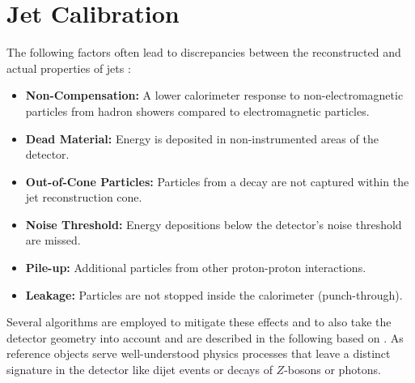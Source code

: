 
\section{Jet Calibration}\label{sec:calibration}
The following factors often lead to discrepancies between the reconstructed and actual properties of jets \citep{atlas2011jet}:
\begin{itemize}
  \item \textbf{Non-Compensation:} A lower calorimeter response to non-electromagnetic particles from hadron showers compared to electromagnetic particles.
  \item \textbf{Dead Material:} Energy is deposited in non-instrumented areas of the detector.
  \item \textbf{Out-of-Cone Particles:} Particles from a decay are not captured within the jet reconstruction cone.
  \item \textbf{Noise Threshold:} Energy depositions below the detector's noise threshold are missed.
  \item \textbf{Pile-up:} Additional particles from other proton-proton interactions.
  \item \textbf{Leakage:} Particles are not stopped inside the calorimeter (punch-through).
\end{itemize}
Several algorithms are employed to mitigate these effects and to also take the detector geometry into account and are described in the following based on \citep{atlas2021jet}. As reference objects serve well-understood physics processes that leave a distinct signature in the detector like dijet events or decays of $Z$-bosons or photons.

